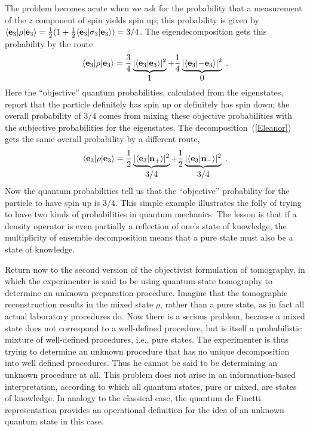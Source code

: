 \documentclass[12pt,aps,eqsecnum]{revtex4-1}
\def\vec#1{{\bf #1}}
\begin{document}
The problem becomes acute when we ask for the probability that a
measurement of the $z$ component of spin yields spin up; this
probability is given by $\langle\vec e_3|\rho|\vec
e_3\rangle={1\over2}(1+{1\over2}\langle\vec e_3|\sigma_3|\vec
e_3\rangle)=3/4$.  The eigendecomposition gets this probability by
the route
\begin{equation}
\langle\vec e_3|\rho|\vec e_3\rangle=
{3\over4}
\underbrace{|\langle\vec e_3|\vec e_3\rangle|^2}_%
{\displaystyle{1}}
+{1\over4}
\underbrace{|\langle\vec e_3|\mathord{-}\vec e_3\rangle|^2}_%
{\displaystyle{0}}\;.
\end{equation}
Here the ``objective'' quantum probabilities, calculated from the
eigenstates, report that the particle definitely has spin up or
definitely has spin down; the overall probability of $3/4$ comes
from mixing these objective probabilities with the subjective
probabilities for the eigenstates.  The
decomposition~(\ref{Eleanor}) gets the same overall probability by
a different route,
\begin{equation}
\langle\vec e_3|\rho|\vec e_3\rangle=
{1\over2}
\underbrace{|\langle\vec e_3|\vec n_+\rangle|^2}_%
{\displaystyle{3/4}}
+{1\over2}
\underbrace{|\langle\vec e_3|\vec n_-\rangle|^2}_%
{\displaystyle{3/4}}
\;.
\end{equation}
Now the quantum probabilities tell us that the ``objective''
probability for the particle to have spin up is $3/4$.  This
simple example illustrates the folly of trying to have two kinds
of probabilities in quantum mechanics.  The lesson is that if a
density operator is even partially a reflection of one's state of
knowledge, the multiplicity of ensemble decomposition means that a
pure state must also be a state of knowledge.

Return now to the second version of the objectivist formulation of
tomography, in which the experimenter is said to be using
quantum-state tomography to determine an unknown preparation
procedure. Imagine that the tomographic reconstruction results in
the mixed state $\rho$, rather than a pure state, as in fact all
actual laboratory procedures do.   Now there is a serious problem,
because a mixed state does not correspond to a well-defined
procedure, but is itself a probabilistic mixture of well-defined
procedures, i.e., pure states.  The experimenter is thus trying to
determine an unknown procedure that has no unique decomposition
into well defined procedures.  Thus he cannot be said to be
determining an unknown procedure at all.  This problem does not
arise in an information-based interpretation, according to which
all quantum states, pure or mixed, are states of knowledge.  In
analogy to the classical case, the quantum de Finetti
representation provides an operational definition for the idea of
an unknown quantum state in this case.
\end{document}
